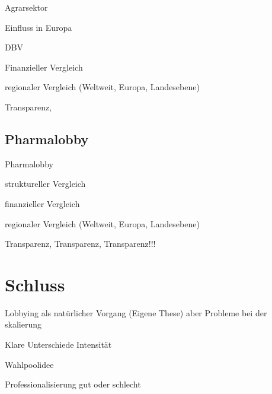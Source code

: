 \begin{itemize*}
	\item Agrarsektor \cite{Neimann200312}
	\item Einfluss in Europa \cite{Neimann200312} \cite{ZeitEuroAgrar}
	\item DBV
	\item Finanzieller Vergleich
	\item regionaler Vergleich (Weltweit, Europa, Landesebene)
	\item Transparenz,
\end{itemize*}
\subsection{Pharmalobby}
\begin{itemize*}
	\item Pharmalobby \cite{BeckLobbyGesundwe}
	\item struktureller Vergleich
	\item finanzieller Vergleich
	\item regionaler Vergleich (Weltweit, Europa, Landesebene)
	\item Transparenz, Transparenz, Transparenz!!!
\end{itemize*}

\section{Schluss}
\begin{itemize*}
\item Lobbying als natürlicher Vorgang (Eigene These) aber Probleme
bei der skalierung
\item Klare Unterschiede Intensität
\item Wahlpoolidee
\item Professionalisierung gut oder schlecht
\end{itemize*}

\newpage
\printbibliography


\listoftodos


